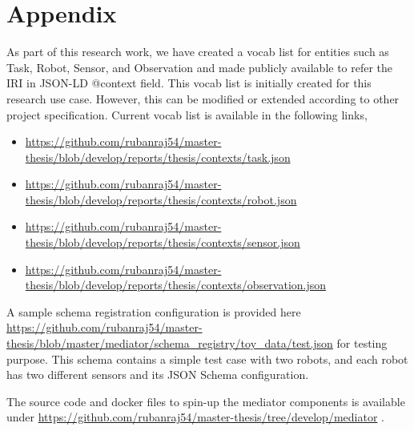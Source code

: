 

\let\cleardoublepage\clearpage
    \chapter{Appendix} \label{appendix}

	As part of this research work, we have created a vocab list for entities such as Task, Robot, Sensor, and Observation and made publicly available to refer the IRI in JSON-LD @context field. This vocab list is initially created for this research use case. However, this can be modified or extended according to other project specification. Current vocab list is available in the following links,
	
	\begin{itemize}
		\item \url{https://github.com/rubanraj54/master-thesis/blob/develop/reports/thesis/contexts/task.json}
		\item \url{https://github.com/rubanraj54/master-thesis/blob/develop/reports/thesis/contexts/robot.json}
		\item \url{https://github.com/rubanraj54/master-thesis/blob/develop/reports/thesis/contexts/sensor.json}
		\item \url{https://github.com/rubanraj54/master-thesis/blob/develop/reports/thesis/contexts/observation.json}
								
	\end{itemize}
	
    A sample schema registration configuration is provided here \url{https://github.com/rubanraj54/master-thesis/blob/master/mediator/schema_registry/toy_data/test.json} for testing purpose. This schema contains a simple test case with two robots, and each robot has two different sensors and its JSON Schema configuration.
	
	The source code and docker files to spin-up the mediator components is available under \url{https://github.com/rubanraj54/master-thesis/tree/develop/mediator} .

%